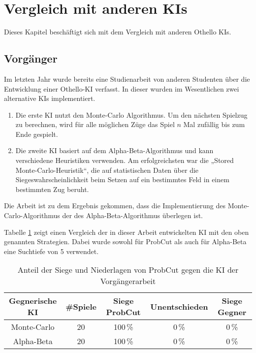 
\section{Vergleich mit anderen KIs}
Dieses Kapitel beschäftigt sich mit dem Vergleich mit anderen Othello KIs.

\subsection{Vorgänger}
Im letzten Jahr wurde bereits eine Studienarbeit von anderen Studenten über die Entwicklung einer Othello-KI verfasst.
In dieser wurden im Wesentlichen zwei alternative KIs implementiert.
\begin{enumerate}
    \item Die erste KI nutzt den Monte-Carlo Algorithmus. Um den nächsten Spielzug zu berechnen, wird für alle möglichen
    Züge das Spiel $n$ Mal zufällig bis zum Ende gespielt.
    \cite[S.~19]{othellustudienarbeit}
    \item Die zweite KI basiert auf dem Alpha-Beta-Algorithmus und kann verschiedene Heuristiken verwenden. Am
    erfolgreichsten war die „Stored Monte-Carlo-Heuristik“, die auf statistischen Daten über die
    Siegeswahrscheinlichkeit beim Setzen auf ein bestimmtes Feld in einem bestimmten Zug beruht.
    \cite[S.~30]{othellustudienarbeit}
\end{enumerate}
Die Arbeit ist zu dem Ergebnis gekommen, dass die Implementierung des Monte-Carlo-Algorithmus der des
Alpha-Beta-Algorithmus überlegen ist.
\cite[S.~55]{othellustudienarbeit}

Tabelle \ref{table:comp:previous} zeigt einen Vergleich der in dieser Arbeit entwickelten KI mit den oben genannten Strategien. Dabei wurde sowohl für ProbCut als auch für Alpha-Beta eine Suchtiefe von 5 verwendet.

\begin{table}[hb]
\centering
\begin{tabular}{c|c|ccc}
\hline
Gegnerische KI & \#Spiele & Siege ProbCut & Unentschieden & Siege Gegner \\
\hline
 Monte-Carlo & 20 & 100\,\% &   0\,\% &  0\,\% \\
 Alpha-Beta   & 20 & 100\,\% &   0\,\% &  0\,\% \\
\hline
\end{tabular}
\caption{Anteil der Siege und Niederlagen von ProbCut gegen die KI der Vorgängerarbeit}
\label{table:comp:previous}
\end{table}
